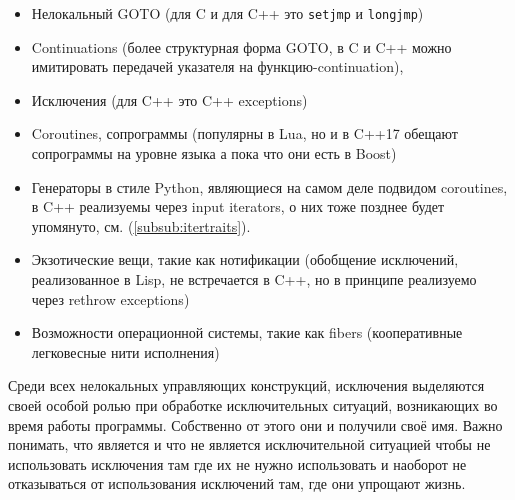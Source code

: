 \documentclass[a4paper,12pt,oneside]{article}
\begin{document}
\begin{itemize}
\item
Нелокальный GOTO (для C и для C++ это \lstinline!setjmp! и \lstinline!longjmp!)
\item
Continuations (более структурная форма GOTO, в C и C++ можно имитировать передачей указателя на функцию-continuation), 
\item
Исключения (для C++ это C++ exceptions)
\item
Coroutines, сопрограммы (популярны в Lua, но и в C++17 обещают сопрограммы на уровне языка а пока что они есть в Boost)
\item
Генераторы в стиле Python, являющиеся на самом деле подвидом coroutines, в C++ реализуемы через input iterators, о них тоже позднее будет упомянуто, см. (\ref{subsub:itertraits}).
\item
Экзотические вещи, такие как нотификации (обобщение исключений, реализованное в Lisp, не встречается в C++, но в принципе реализуемо через rethrow exceptions)
\item
Возможности операционной системы, такие как fibers (кооперативные легковесные нити исполнения)
\end{itemize}

Среди всех нелокальных управляющих конструкций, исключения выделяются своей особой ролью при обработке исключительных ситуаций, возникающих во время работы программы. Собственно от этого они и получили своё имя. Важно понимать, что является и что не является исключительной ситуацией чтобы не использовать исключения там где их не нужно использовать и наоборот не отказываться от использования исключений там, где они упрощают жизнь.
\end{document}
